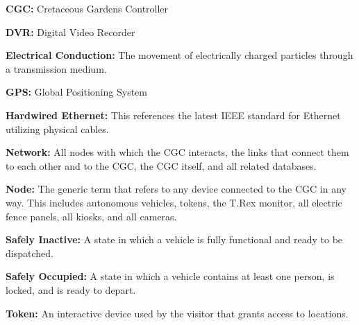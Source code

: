 \documentclass[12pt]{article}
\begin{document}
\begin{list}{}{}
    \item \textbf{CGC:} Cretaceous Gardens Controller 
    \item \textbf{DVR:} Digital Video Recorder
    \item \textbf{Electrical Conduction:} The movement of electrically charged particles through a transmission medium.
    \item \textbf{GPS:} Global Positioning System 
    \item \textbf{Hardwired Ethernet:} This references the latest IEEE standard for Ethernet utilizing physical cables.
    \item \textbf{Network:} All nodes with which the CGC interacts, the links that connect them to each other and to the CGC, the CGC itself, and all related databases.
    \item \textbf{Node:} The generic term that refers to any device connected to the CGC in any way. This includes autonomous vehicles, tokens, the T.Rex monitor, all electric fence panels, all kiosks, and all cameras.
    \item \textbf{Safely Inactive:} A state in which a vehicle is fully functional and ready to be dispatched.
    \item \textbf{Safely Occupied:} A state in which a vehicle contains at least one person, is locked, and is ready to depart.
    \item \textbf{Token:} An interactive device used by the visitor that grants access to locations.
\end{list}
\pagebreak

\end{document}
